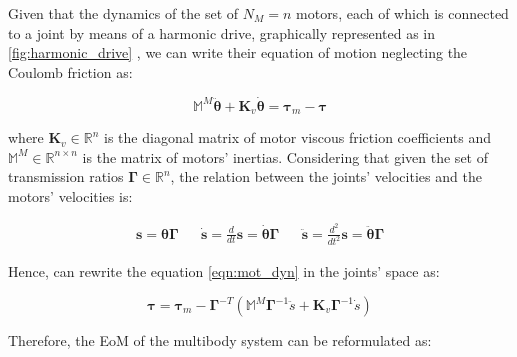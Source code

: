 Given that the dynamics of the set of $N _M = n$ motors, each of which is connected to a joint by means of a harmonic drive, graphically represented as in \cref{fig:harmonic_drive} \citep{folga2010}, we can write their equation of motion neglecting the Coulomb friction as:

\begin{equation}
    \mathbb{M} ^M \ddot{\boldsymbol{\theta}} + \mathbf{K}_v \dot{\boldsymbol{\theta}} = \boldsymbol{\tau}_m - \boldsymbol{\tau}
    \label{eqn:mot_dyn}
\end{equation}

where $\mathbf{K}_v \in \mathbb{R}^n$ is the diagonal matrix of motor viscous friction coefficients and $\mathbb{M}^M \in \mathbb{R}^{n \times n}$ is the matrix of motors' inertias. Considering that given the set of transmission ratios $\boldsymbol{\Gamma} \in \mathbb{R}^n$, the relation between the joints' velocities and the motors' velocities is:

\begin{align}
    \mathbf{s} = \boldsymbol{\theta} \boldsymbol{\Gamma} &  & \dot{\mathbf{s}} = \frac{d}{dt} \mathbf{s} = \dot{\boldsymbol{\theta}} \boldsymbol{\Gamma} &  & \ddot{\mathbf{s}} = \frac{d^2}{dt^2} \mathbf{s} = \ddot{\boldsymbol{\theta}} \boldsymbol{\Gamma}
\end{align}

Hence, can rewrite the equation \cref{eqn:mot_dyn} in the joints' space as:

\begin{equation}
    \label{eqn:mot_dyn_jointspace}
    \boldsymbol{\tau} = \boldsymbol{\tau}_m - \boldsymbol{\Gamma} ^{-T} (\mathbb{M} ^M\boldsymbol{\Gamma} ^{-1} \ddot{s} + \mathbf{K}_v \boldsymbol{\Gamma} ^{-1}\dot{s})
\end{equation}

Therefore, the \ac{EoM} of the multibody system can be reformulated as:

